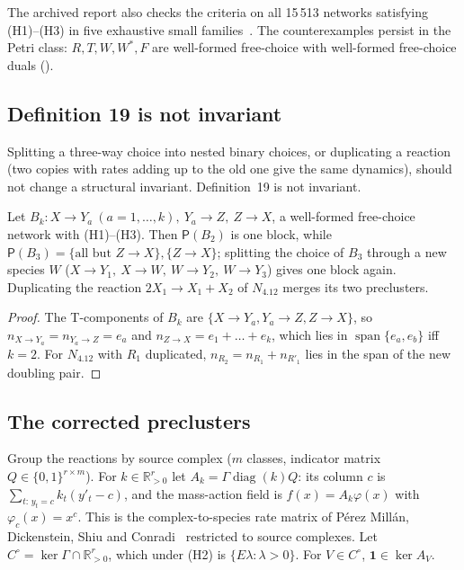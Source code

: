\documentclass[11pt,a4paper]{report}
\newcommand{\spn}{\operatorname{span}}
\newcommand{\Pre}{\mathsf{P}}
\newcommand{\Rp}{\mathbb{R}_{>0}}
\begin{document}
The archived report also checks the criteria on all 15\,513 networks satisfying (H1)--(H3) in five exhaustive small
families~\autocite[§4]{ArchivedReport}. The counterexamples persist in the Petri class: \(R,T,W,W^*,F\) are
well-formed free-choice with well-formed free-choice duals ().

\subsection{Definition 19 is not invariant}

Splitting a three-way choice into nested binary choices, or duplicating a reaction (two copies with rates adding up
to the old one give the same dynamics), should not change a structural invariant. Definition~19 is not invariant.

\begin{proposition}[agents P, Q2]\label{prop:split}
Let \(B_k\colon X\to Y_a\ (a=1,\dots,k),\ Y_a\to Z,\ Z\to X\), a well-formed free-choice network with (H1)--(H3).
Then \(\Pre(B_2)\) is one block, while \(\Pre(B_3)=\{\text{all but }Z\to X\},\{Z\to X\}\); splitting the choice of
\(B_3\) through a new species \(W\) (\(X\to Y_1,\ X\to W,\ W\to Y_2,\ W\to Y_3\)) gives one block again.
Duplicating the reaction \(2X_1\to X_1+X_2\) of \(N_{4.12}\) merges its two preclusters.
\end{proposition}
\begin{proof}
The T-components of \(B_k\) are \(\{X\to Y_a,Y_a\to Z,Z\to X\}\), so \(n_{X\to Y_a}=n_{Y_a\to Z}=e_a\) and
\(n_{Z\to X}=e_1+\dots+e_k\), which lies in \(\spn\{e_a,e_b\}\) iff \(k=2\). For \(N_{4.12}\) with \(R_1\) duplicated,
\(n_{R_2}=n_{R_1}+n_{R'_1}\) lies in the span of the new doubling pair.
\end{proof}

\subsection{The corrected preclusters}\label{sec:Phat}

Group the reactions by source complex (\(m\) classes, indicator matrix \(Q\in\{0,1\}^{r\times m}\)). For
\(k\in\Rp^r\) let \(A_k=\Gamma\operatorname{diag}(k)Q\): its column \(c\) is \(\sum_{t:\,y_t=c}k_t(y'_t-c)\), and the
mass-action field is \(f(x)=A_k\varphi(x)\) with \(\varphi_c(x)=x^c\). This is the complex-to-species rate matrix of
Pérez Millán, Dickenstein, Shiu and Conradi~\autocite{PerezMillan2012} restricted to source complexes. Let
\(C^\circ=\ker\Gamma\cap\Rp^r\), which under (H2) is \(\{E\lambda:\lambda>0\}\). For \(V\in C^\circ\),
\(\mathbf 1\in\ker A_V\).
\end{document}

